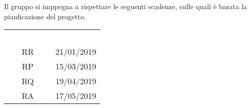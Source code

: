 Il gruppo \gruppo\space si imppegna a rispettare le seguenti scadenze, sulle quali
è basata la pianficazione del progetto.

\renewcommand{\arraystretch}{1}
\begin{center}
    \begin{tabular}{| c| c | }
        \hline
        \rowcolor{greySWEight}
        \textcolor{white}{\textbf{Revisione}} & \textcolor{white}{\textbf{Scadenza}}\\
        RR & 21/01/2019 \\
        RP & 15/03/2019 \\
        RQ & 19/04/2019 \\
        RA & 17/05/2019 \\
        \hline
    \end{tabular}
\end{center}

   